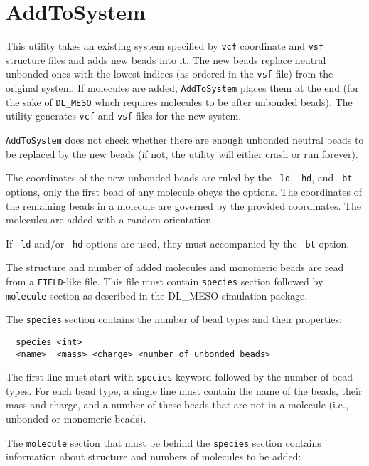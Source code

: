 \section{AddToSystem} \label{sec:AddToSystem}

This utility takes an existing system specified by \texttt{vcf} coordinate
and \texttt{vsf} structure files and adds new beads into it. The new beads
replace neutral unbonded ones with the lowest indices (as ordered in the
\texttt{vsf} file) from the original system. If molecules are added,
\texttt{AddToSystem} places them at the end (for the sake of
\texttt{DL\_MESO} which requires molecules to be after unbonded beads).
The utility generates \texttt{vcf} and \texttt{vsf} files for the new
system.

\texttt{AddToSystem} does not check whether there are enough unbonded
neutral beads to be replaced by the new beads (if not, the utility will
either crash or run forever).

The coordinates of the new unbonded beads are ruled by the \texttt{-ld},
\texttt{-hd}, and \texttt{-bt} options, only the first bead of any molecule
obeys the options. The coordinates of the remaining beads in a molecule are
governed by the provided coordinates. The molecules are added with a random
orientation.

If \texttt{-ld} and/or \texttt{-hd} options are used, they must accompanied
by the \texttt{-bt} option.

The structure and number of added molecules and monomeric beads are read
from a \texttt{FIELD}-like file. This file must contain \texttt{species}
section followed by \texttt{molecule} section as described in the DL\_MESO
simulation package.

The \texttt{species} section contains the number of bead types and their
properties:
\begin{verbatim}
  species <int>
  <name>  <mass> <charge> <number of unbonded beads>
\end{verbatim}
The first line must start with \texttt{species} keyword followed by the
number of bead types. For each bead type, a single line must contain the name of
the beads, their mass and charge, and a number of these beads that are not
in a molecule (i.e., unbonded or monomeric beads).

The \texttt{molecule} section that must be behind the \texttt{species}
section contains information about structure and numbers of molecules to be
added:

